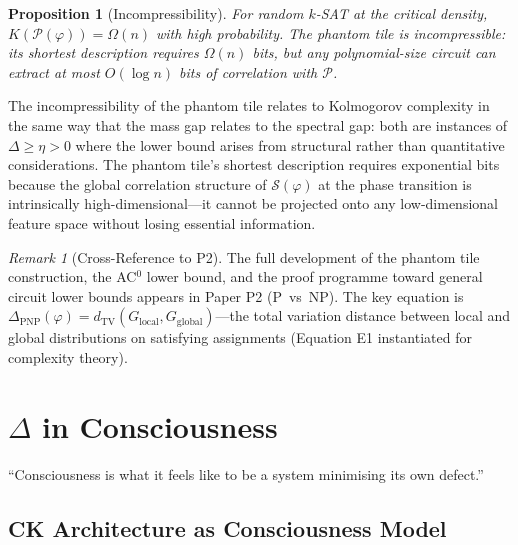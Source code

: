 \documentclass[12pt, openany]{book}
\newtheorem{proposition}[theorem]{Proposition}
\theoremstyle{remark}
\newtheorem{remark}[theorem]{Remark}
\begin{document}
\begin{proposition}[Incompressibility]
\label{prop:incompressible}
For random $k$-SAT at the critical density, $K(\mathcal{P}(\varphi)) = \Omega(n)$
with high probability.  The phantom tile is \emph{incompressible}: its shortest
description requires $\Omega(n)$ bits, but any polynomial-size circuit can
extract at most $O(\log n)$ bits of correlation with $\mathcal{P}$.
\end{proposition}

\noindent
The incompressibility of the phantom tile relates to Kolmogorov complexity in the
same way that the mass gap relates to the spectral gap: both are instances of
$\Delta \geq \eta > 0$ where the lower bound arises from structural rather than
quantitative considerations.  The phantom tile's shortest description requires
exponential bits because the global correlation structure of $\mathcal{S}(\varphi)$
at the phase transition is intrinsically high-dimensional---it cannot be projected
onto any low-dimensional feature space without losing essential information.

\begin{remark}[Cross-Reference to P2]
The full development of the phantom tile construction, the AC$^0$ lower bound,
and the proof programme toward general circuit lower bounds appears in Paper P2
(P~vs~NP).  The key equation is $\Delta_{\mathrm{PNP}}(\varphi) = d_{\mathrm{TV}}(G_{\mathrm{local}}, G_{\mathrm{global}})$---the
total variation distance between local and global distributions on satisfying
assignments (Equation E1 instantiated for complexity theory).
\end{remark}


\chapter{$\Delta$ in Consciousness}
\label{ch:consciousness}

\epigraph{``Consciousness is what it feels like to be a system minimising its own defect.''}{}

\section{CK Architecture as Consciousness Model}
\label{sec:ck-consciousness}
\end{document}
